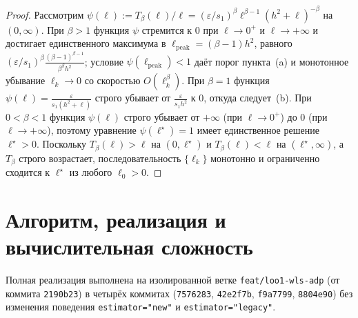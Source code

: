\documentclass[11pt,a4paper]{article}
\numberwithin{equation}{section}
\theoremstyle{definition}
\theoremstyle{remark}
\newcommand{\code}[1]{\nolinkurl{#1}}
\begin{document}
\begin{proof}
Рассмотрим $\psi(\ell) := T_\beta(\ell)/\ell = (\varepsilon/s_1)^\beta \ell^{\beta - 1} (h^2 + \ell)^{-\beta}$ на $(0, \infty)$.
При $\beta > 1$ функция $\psi$ стремится к $0$ при $\ell \to 0^+$ и $\ell \to +\infty$ и достигает
единственного максимума в $\ell_{\mathrm{peak}} = (\beta - 1) h^2$, равного
$(\varepsilon/s_1)^\beta \frac{(\beta-1)^{\beta-1}}{\beta^\beta h^2}$; условие $\psi(\ell_{\mathrm{peak}}) < 1$
даёт порог пункта~(a) и монотонное убывание $\ell_k \to 0$ со скоростью $O(\ell_k^\beta)$.
При $\beta = 1$ функция $\psi(\ell) = \frac{\varepsilon}{s_1(h^2 + \ell)}$ строго убывает от $\frac{\varepsilon}{s_1 h^2}$ к $0$,
откуда следует~(b).
При $0 < \beta < 1$ функция $\psi(\ell)$ строго убывает от $+\infty$ (при $\ell \to 0^+$) до $0$ (при $\ell \to +\infty$),
поэтому уравнение $\psi(\ell^\star) = 1$ имеет единственное решение $\ell^\star > 0$.
Поскольку $T_\beta(\ell) > \ell$ на $(0, \ell^\star)$ и $T_\beta(\ell) < \ell$ на $(\ell^\star, \infty)$,
а $T_\beta$ строго возрастает, последовательность $\{\ell_k\}$ монотонно и ограниченно сходится к $\ell^\star$ из любого $\ell_0 > 0$.
\end{proof}

\section{Алгоритм, реализация и вычислительная сложность}
\label{sec:impl}

Полная реализация выполнена на изолированной ветке \code{feat/loo1-wls-adp} (от коммита \code{2190b23})
в четырёх коммитах (\code{7576283}, \code{42e2f7b}, \code{f9a7799}, \code{8804e90}) без изменения
поведения \code{estimator="new"} и \code{estimator="legacy"}.
\end{document}
